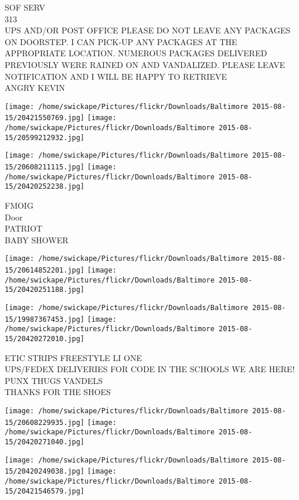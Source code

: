 \documentclass[10pt,letterpaper]{article}
\begin{document}
SOF SERV\\
313\\
UPS AND/OR POST OFFICE PLEASE DO NOT LEAVE ANY PACKAGES ON DOORSTEP.  I CAN PICK{-}UP ANY PACKAGES AT THE APPROPRIATE LOCATION.  NUMEROUS PACKAGES DELIVERED PREVIOUSLY WERE RAINED ON AND VANDALIZED.  PLEASE LEAVE NOTIFICATION AND I WILL BE HAPPY TO RETRIEVE\\
ANGRY KEVIN\\
\pagebreak

\texttt{[image: /home/swickape/Pictures/flickr/Downloads/Baltimore 2015-08-15/20421550769.jpg]}
\texttt{[image: /home/swickape/Pictures/flickr/Downloads/Baltimore 2015-08-15/20599212932.jpg]}

\texttt{[image: /home/swickape/Pictures/flickr/Downloads/Baltimore 2015-08-15/20608211115.jpg]}
\texttt{[image: /home/swickape/Pictures/flickr/Downloads/Baltimore 2015-08-15/20420252238.jpg]}

FMOIG\\
Door\\
PATRIOT\\
BABY SHOWER\\
\pagebreak

\texttt{[image: /home/swickape/Pictures/flickr/Downloads/Baltimore 2015-08-15/20614852201.jpg]}
\texttt{[image: /home/swickape/Pictures/flickr/Downloads/Baltimore 2015-08-15/20420251188.jpg]}

\texttt{[image: /home/swickape/Pictures/flickr/Downloads/Baltimore 2015-08-15/19987367453.jpg]}
\texttt{[image: /home/swickape/Pictures/flickr/Downloads/Baltimore 2015-08-15/20420272010.jpg]}

ETIC STRIPS FREESTYLE LI ONE\\
UPS/FEDEX DELIVERIES FOR CODE IN THE SCHOOLS WE ARE HERE!\\
PUNX THUGS VANDELS\\
THANKS FOR THE SHOES\\
\pagebreak

\texttt{[image: /home/swickape/Pictures/flickr/Downloads/Baltimore 2015-08-15/20608229935.jpg]}
\texttt{[image: /home/swickape/Pictures/flickr/Downloads/Baltimore 2015-08-15/20420271040.jpg]}

\texttt{[image: /home/swickape/Pictures/flickr/Downloads/Baltimore 2015-08-15/20420249038.jpg]}
\texttt{[image: /home/swickape/Pictures/flickr/Downloads/Baltimore 2015-08-15/20421546579.jpg]}
\end{document}
